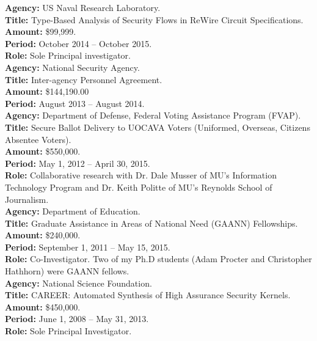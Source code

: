 \documentclass[12pt]{article} %
\begin{document}
{\bf Agency:} US Naval Research Laboratory.
\\
{\bf Title:} Type-Based Analysis of Security Flows in ReWire Circuit Specifications.
\\
{\bf Amount:} \$99,999.
\\
{\bf Period:}   October 2014  --  October 2015.
\\
{\bf Role:}     Sole Principal investigator.
\\

{\bf Agency:} National Security Agency.\\
{\bf Title:} Inter-agency Personnel Agreement.\\
{\bf Amount:} \$144,190.00 \\
{\bf Period:} August 2013 -- August 2014.
\\


{\bf Agency:} Department of Defense, Federal Voting Assistance Program (FVAP).
\\
{\bf Title:} Secure Ballot Delivery to UOCAVA Voters (Uniformed, Overseas, Citizens Absentee Voters). 
\\
{\bf Amount:} \$550,000.
\\
{\bf Period:} May 1, 2012 -- April 30, 2015.
\\
{\bf Role:} Collaborative research with Dr. Dale Musser of MU's Information Technology Program and Dr. Keith Politte of MU's Reynolds School of Journalism. 
\\



{\bf Agency:} Department of Education.
 ~\\
{\bf Title:} Graduate Assistance in Areas of National Need (GAANN) Fellowships.
\\
{\bf Amount:} \$240,000.
\\
{\bf Period:} September 1, 2011 -- May 15, 2015.
\\
{\bf Role:} Co-Investigator. Two of my Ph.D students (Adam Procter and Christopher Hathhorn) were GAANN fellows. 
\\

{\bf Agency:} National Science Foundation.
\\
{\bf Title:} CAREER: Automated Synthesis of High Assurance Security Kernels.
\\
{\bf Amount:} \$450,000.
\\
{\bf Period:}   June 1, 2008  --  May 31, 2013.
\\
{\bf Role:}      Sole Principal Investigator.
\\
\end{document}
